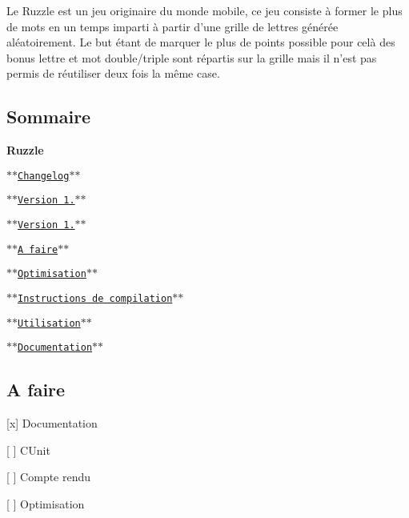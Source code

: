 Le Ruzzle est un jeu originaire du monde mobile, ce jeu consiste à former le plus de mots en un temps imparti à partir d'une grille de lettres générée aléatoirement. Le but étant de marquer le plus de points possible pour celà des bonus lettre et mot double/triple sont répartis sur la grille mais il n'est pas permis de réutiliser deux fois la même case.

\subsection*{Sommaire}

{\bfseries Ruzzle}
\begin{DoxyEnumerate}
\item $\ast$$\ast$\href{#changelog}{\tt Changelog}$\ast$$\ast$
\begin{DoxyItemize}
\item $\ast$$\ast$\href{#version-10}{\tt Version 1.}$\ast$$\ast$
\item $\ast$$\ast$\href{#version-101-à-venir}{\tt Version 1.}$\ast$$\ast$
\end{DoxyItemize}
\item $\ast$$\ast$\href{#a-faire}{\tt A faire}$\ast$$\ast$
\item $\ast$$\ast$\href{#optimisation}{\tt Optimisation}$\ast$$\ast$
\end{DoxyEnumerate}
\begin{DoxyEnumerate}
\item $\ast$$\ast$\href{#instructions-de-compilation}{\tt Instructions de compilation}$\ast$$\ast$
\item $\ast$$\ast$\href{#utilisation}{\tt Utilisation}$\ast$$\ast$
\item $\ast$$\ast$\href{#documentation}{\tt Documentation}$\ast$$\ast$
\end{DoxyEnumerate}

\subsection*{A faire}


\begin{DoxyItemize}
\item \mbox{[}x\mbox{]} Documentation
\item \mbox{[} \mbox{]} C\-Unit
\item \mbox{[} \mbox{]} Compte rendu
\item \mbox{[} \mbox{]} Optimisation
\end{DoxyItemize}

